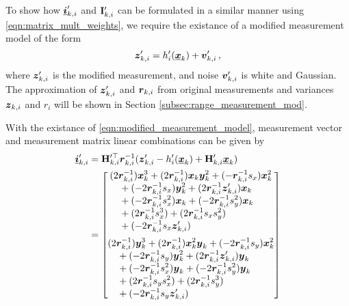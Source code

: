 \documentclass[twocolumn]{autart}
\begin{document}
To show how ${\boldsymbol{\underline{i}}}'_{k,i}$ and ${{\mathbf{I}}}'_{k,i}$ can be formulated in a similar manner using \eqref{eqn:matrix_mult_weights}, we require the existance of a modified measurement model of the form
\begin{equation}
    {\boldsymbol{z}}'_{k,i} = h'_i({\boldsymbol{\underline{x}}}_k)+{\boldsymbol{v}}'_{k,i}\,, \label{eqn:modified_measurement_model}
\end{equation}
where ${\boldsymbol{z}}'_{k,i}$ is the modified measurement, and noise ${\boldsymbol{v}}'_{k,i}$ is white and Gaussian. The approximation of ${\boldsymbol{z}}'_{k,i}$ and ${\boldsymbol{r}}_{k,i}$ from original measurements and variances ${\boldsymbol{z}}_{k,i}$ and $r_i$ will be shown in Section \ref{subsec:range_measurement_mod}. 

With the existance of \eqref{eqn:modified_measurement_model}, measurement vector and measurement matrix linear combinations can be given by
\begin{equation}
    \begin{split}
        \rvec{i}'_{k,i} &= \mat{H}_{k,i}^{\prime\top} \rv{r}_{k,i}^{-1}(\rv{z}'_{k,i} - h'_i(\rvec{x}_k) + \mat{H}'_{k,i}\rvec{x}_k) \\
        &= 
        \begin{bmatrix}
            \begin{split}
                &(2\rv{r}_{k,i}^{-1})\rv{x}_k^3 + (2\rv{r}_{k,i}^{-1})\rv{x}_k\rv{y}_k^2 + (-\rv{r}_{k,i}^{-1}s_x)\rv{x}_k^2 \\
                &\quad+ (-2\rv{r}_{k,i}^{-1}s_x)\rv{y}_k^2 + (2\rv{r}_{k,i}^{-1}\rv{z}'_{k,i})\rv{x}_k \\
                &\quad+ (-2\rv{r}_{k,i}^{-1}s_x^2)\rv{x}_k + (-2\rv{r}_{k,i}^{-1}s_y^2)\rv{x}_k \\
                &\quad+ (2\rv{r}_{k,i}^{-1}s_x^3) + (2\rv{r}_{k,i}^{-1}s_xs_y^2) \\
                &\quad+ (-2\rv{r}_{k,i}^{-1}s_x \rv{z}'_{k,i})
            \end{split}
            \vspace{5pt}\\
            \begin{split}
                &(2\rv{r}_{k,i}^{-1})\rv{y}_k^3 + (2\rv{r}_{k,i}^{-1})\rv{x}_k^2\rv{y}_k + (-2\rv{r}_{k,i}^{-1}s_y)\rv{x}_k^2 \\
                &\quad+ (-2\rv{r}_{k,i}^{-1}s_y)\rv{y}_k^2 + (2\rv{r}_{k,i}^{-1}\rv{z}'_{k,i})\rv{y}_k \\
                &\quad+ (-2\rv{r}_{k,i}^{-1}s_x^2)\rv{y}_k + (-2\rv{r}_{k,i}^{-1}s_y^2)\rv{y}_k \\
                &\quad+ (2\rv{r}_{k,i}^{-1}s_ys_x^2) + (2\rv{r}_{k,i}^{-1}s_y^3) \\
                &\quad+ (-2\rv{r}_{k,i}^{-1}s_y\rv{z}'_{k,i})
            \end{split}
        \end{bmatrix}
    \end{split} \label{eqn:hrz_linear_comb}
\end{equation}
\end{document}
